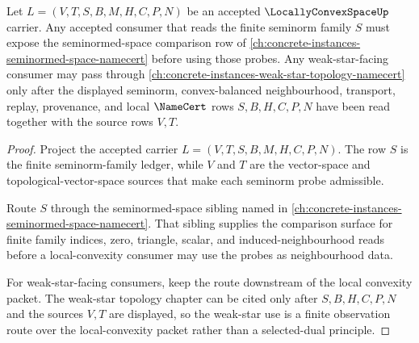 \begin{theorem}
\label{thm:locally-convex-space-seminorm-family-obligation}
Let $L=(V,T,S,B,M,H,C,P,N)$ be an accepted $\LocallyConvexSpaceUp$ carrier. Any accepted consumer that reads the finite seminorm family $S$ must expose the seminormed-space comparison row of \autoref{ch:concrete-instances-seminormed-space-namecert} before using those probes. Any weak-star-facing consumer may pass through \autoref{ch:concrete-instances-weak-star-topology-namecert} only after the displayed seminorm, convex-balanced neighbourhood, transport, replay, provenance, and local $\NameCert$ rows $S,B,H,C,P,N$ have been read together with the source rows $V,T$.
\end{theorem}
\begin{proof}
Project the accepted carrier $L=(V,T,S,B,M,H,C,P,N)$. The row $S$ is the finite seminorm-family ledger, while $V$ and $T$ are the vector-space and topological-vector-space sources that make each seminorm probe admissible.

Route $S$ through the seminormed-space sibling named in \autoref{ch:concrete-instances-seminormed-space-namecert}. That sibling supplies the comparison surface for finite family indices, zero, triangle, scalar, and induced-neighbourhood reads before a local-convexity consumer may use the probes as neighbourhood data.

For weak-star-facing consumers, keep the route downstream of the local convexity packet. The weak-star topology chapter can be cited only after $S,B,H,C,P,N$ and the sources $V,T$ are displayed, so the weak-star use is a finite observation route over the local-convexity packet rather than a selected-dual principle.
\end{proof}

